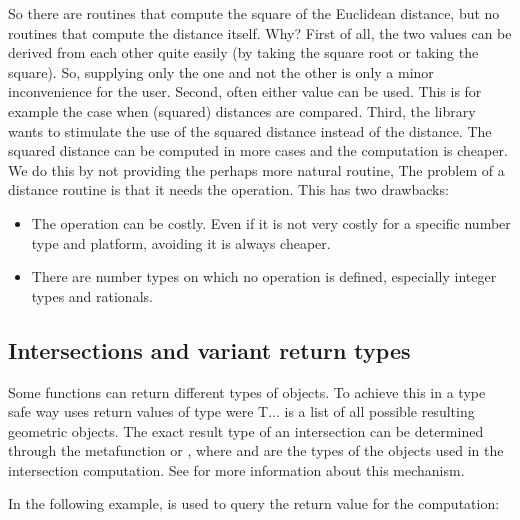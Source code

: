So there are routines that compute the square of the Euclidean distance, but no
routines that compute the distance itself. Why?
First of all, the two values can be derived from each other quite easily (by
taking the square root or taking the square). So, supplying only the one and
not the other is only a minor inconvenience for the user.
Second, often either value can be used. This is for example the case when
(squared) distances are compared.
Third, the library wants to stimulate the use of the squared distance instead
of the distance. The squared distance can be computed in more cases and the
computation is cheaper.
We do this by not providing the perhaps more natural routine,
The problem of a distance routine is that it needs the 
operation.
This has two drawbacks:
\begin{itemize}
\item
The  operation can be costly. Even if it is not very costly for
a specific number type and platform, avoiding it is always cheaper.
\item
There are number types on which no  operation is defined,
especially integer types and rationals.
\end{itemize}

\subsection{Intersections and variant return types}
Some functions can return different types of objects. To achieve this
in a type safe way {\cgal} uses return values of type
 were T... is a
list of all possible resulting geometric objects.  The exact result
type of an intersection can be determined through the metafunction
 or
, where
 and  are the types of the objects used in the
intersection computation. See
for more information about this mechanism.

\ccExample

In the following example,  is used to query the return
value for the  computation:


